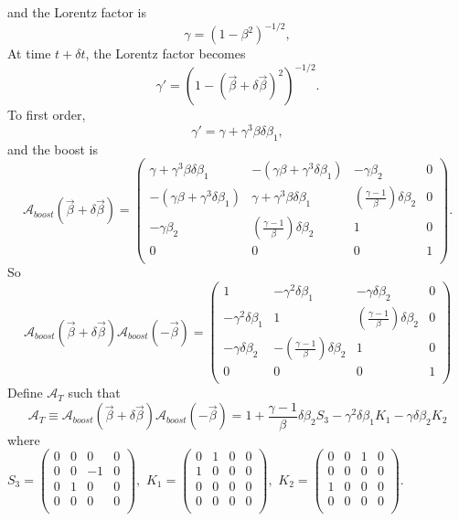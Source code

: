 \documentclass{outhesis}
\begin{document}
and the Lorentz factor is 
\[
\gamma = \left(1-\beta^2 \right)^{-1/2},
\]
At time $t + \delta t$, the Lorentz factor becomes 
\[
\gamma' = \left(1-\left(\overrightarrow{\beta} +  \delta \overrightarrow{\beta} \right)^2 \right)^{-1/2}. 
\]
To first order, 
\[
\gamma' = \gamma + \gamma^3\beta \delta \beta_1, 
\]
and the boost is 
\[
\mathcal{A}_{boost}\left(\overrightarrow{\beta} +  \delta \overrightarrow{\beta}  \right) =
\begin{pmatrix}
\gamma + \gamma^3\beta \delta \beta_1 & -\left(\gamma \beta + \gamma^3 \delta \beta_1\right) & -\gamma \beta_2 & 0 \\
-\left(\gamma \beta + \gamma^3 \delta \beta_1\right)   & \gamma + \gamma^3\beta \delta \beta_1 & \left(\frac{\gamma-1}{\beta} \right) \delta \beta_2 & 0 \\
-\gamma \beta_2 & \left(\frac{\gamma-1}{\beta} \right) \delta \beta_2  & 1 & 0 \\
0 & 0 & 0 & 1 \\
\end{pmatrix}.
\]
So
\[
\mathcal{A}_{boost}\left(\overrightarrow{\beta} +  \delta \overrightarrow{\beta}  \right) \mathcal{A}_{boost}\left(-\overrightarrow{\beta}\right) =
\begin{pmatrix}
1 & -\gamma^2 \delta \beta_1 & -\gamma \delta \beta_2 & 0 \\
-\gamma^2 \delta \beta_1 & 1 & \left(\frac{\gamma-1}{\beta} \right) \delta \beta_2 & 0 \\
-\gamma \delta \beta_2 & - \left(\frac{\gamma-1}{\beta} \right) \delta \beta_2 & 1 & 0 \\
0 & 0 & 0 & 1\\
\end{pmatrix}
\]
Define $\mathcal{A}_T$ such that 
\[
\mathcal{A}_T \equiv \mathcal{A}_{boost}\left(\overrightarrow{\beta} +  \delta \overrightarrow{\beta}  \right) \mathcal{A}_{boost}\left(-\overrightarrow{\beta}\right) =
1 + \frac{\gamma - 1}{\beta} \delta \beta_2 S_3 - \gamma^2 \delta \beta_1 K_1 - \gamma \delta \beta_2 K_2
\]
where \\
$
S_3 = 
\begin{pmatrix}
0 & 0 & 0 & 0\\
0 & 0 & -1 & 0\\
0 & 1 & 0 & 0\\
0 & 0 &0 & 0\\
\end{pmatrix},
$  
$
K_1 = 
\begin{pmatrix}
  0 & 1 &0 & 0\\
1 & 0 & 0 & 0\\
0 & 0 & 0 & 0\\
0 & 0 &0 & 0\\
\end{pmatrix},
$
$
K_2 =
\begin{pmatrix}
0 & 0 & 1 & 0\\
0 & 0 & 0 & 0\\
1 & 0 & 0 & 0\\
0 & 0 &0 & 0\\
\end{pmatrix}
$.
\end{document}
